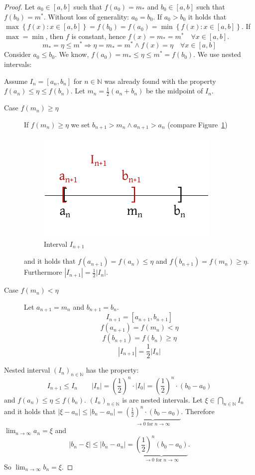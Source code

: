 \documentclass[a4paper,landscape,twocolumn]{article}
\theoremstyle{definition}
\newcommand\set[1]{\left\{#1\right\}}
\newcommand\abs[1]{\left|#1\right|}
\newcommand\seq[1]{{\left(#1\right)}_{n \in \mathbb N}}
\begin{document}
\begin{proof}
  Let $a_0 \in [a, b]$ such that $f(a_0) = m_*$ and $b_0 \in [a, b]$ such that $f(b_0) = m^*$.
  Without loss of generality: $a_0 = b_0$.
  If $a_0 > b_0$ it holds that $\max\set{f(x): x \in [a,b]} = f(b_0) = f(a_0) = \min\set{f(x): x \in [a, b]}$.
  If $\max = \min$, then $f$ is constant, hence $f(x) = m_* = m^* \quad\forall x \in [a, b]$.
  \[ m_* = \eta \leq m^* \Rightarrow \eta = m_* = m^* \land f(x) = \eta \quad\forall x \in [a,b] \]
  Consider $a_0 \leq b_0$. We know, $f(a_0) = m_* \leq \eta \leq m^* = f(b_0)$.
  We use nested intervals:

  Assume $I_n = [a_n, b_n]$ for $n \in \mathbb N$ was already found with the property $f(a_n) \leq \eta \leq f(b_n)$.
  Let $m_n = \frac12 (a_n + b_n)$ be the midpoint of $I_n$.
  \begin{description}
    \item[Case $f(m_n) \geq \eta$]
      If $f(m_n) \geq \eta$ we set $b_{n+1} > m_n \land a_{n+1} > a_n$ (compare Figure~\ref{img:am_bm})
      \begin{figure}[!h]
        \begin{center}
          \includegraphics{img/am_bm.pdf}
          \caption{Interval $I_{n+1}$}
          \label{img:am_bm}
        \end{center}
      \end{figure}
      and it holds that $f(a_{n+1}) = f(a_n) \leq \eta$ and $f(b_{n+1}) = f(m_n) \geq \eta$.
      Furthermore $\abs{I_{n+1}} = \frac12 \abs{I_n}$.
    \item[Case $f(m_n) < \eta$]
      Let $a_{n+1} = m_n$ and $b_{n + 1} = b_n$.
      \[ I_{n+1} = [a_{n+1}, b_{n+1}] \]
      \[ f(a_{n+1}) = f(m_n) < \eta \]
      \[ f(b_{n+1}) = f(b_n) \geq \eta \]
      \[ \abs{I_{n+1}} = \frac12 \abs{I_n} \]
  \end{description}
  Nested interval $\seq{I_n}$ has the property:
  \[ I_{n+1} \leq I_n \qquad \abs{I_n} = \left(\frac12\right)^n \cdot \abs{I_0} = \left(\frac12\right)^n \cdot (b_0 - a_0) \]
  and $f(a_n) \leq \eta \leq f(b_n)$. $\seq{I_n}$ is are nested intervals.
  Let $\xi \in \bigcap_{n\in\mathbb N} I_n$ and it holds that $\abs{\xi - a_n} \leq \abs{b_n - a_n} = \underbrace{\left(\frac12\right)^n \cdot (b_0 - a_0)}_{\to 0 \text{ for } n \to \infty}$.
  Therefore $\lim_{n\to\infty} a_n = \xi$ and
  \[
    \abs{b_n - \xi} \leq \abs{b_n - a_n}
    = \underbrace{\left(\frac12\right)^n (b_0 - a_0)}_{\to 0 \text{ for } n \to \infty}.
  \]
  So $\lim_{n\to\infty} b_n = \xi$.


\end{proof}
\end{document}
